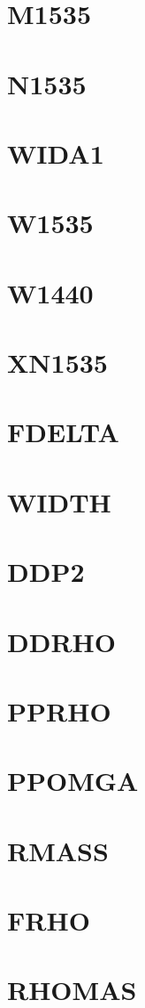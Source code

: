 \documentclass[10pt,UTF8]{ctexbook}
\begin{document}
\section{M1535}
\section{N1535}
\section{WIDA1}
\section{W1535}
\section{W1440}
\section{XN1535}
\section{FDELTA}
\section{WIDTH}
\section{DDP2}
\section{DDRHO}
\section{PPRHO}
\section{PPOMGA}
\section{RMASS}
\section{FRHO}
\section{RHOMAS}
\end{document}
